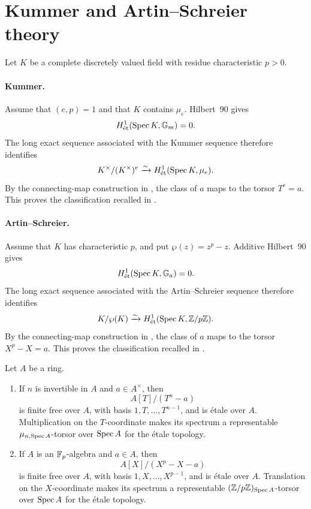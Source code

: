 \section{Kummer and Artin--Schreier theory}
\label{appendix:kummer_and_as_proofs}

Let $K$ be a complete discretely valued field with residue characteristic
$p>0$.

\paragraph{Kummer.}

Assume that $(e,p)=1$ and that $K$ contains $\mu_e$. Hilbert~90 gives
\[
H^1_{\mathrm{\acute et}}(\operatorname{Spec} K,\mathbb{G}_m)=0.
\]
The long exact sequence associated with the Kummer sequence therefore
identifies
\[
K^\times/(K^\times)^e
\xrightarrow{\sim}
H^1_{\mathrm{\acute et}}(\operatorname{Spec} K,\mu_e).
\]
By the connecting-map construction in
, the class of $a$ maps to
the torsor $T^e=a$. This proves the classification recalled in
.

\paragraph{Artin--Schreier.}

Assume that $K$ has characteristic $p$, and put $\wp(z)=z^p-z$.
Additive Hilbert~90 gives
\[
H^1_{\mathrm{\acute et}}(\operatorname{Spec} K,\mathbb{G}_a)=0.
\]
The long exact sequence associated with the Artin--Schreier sequence therefore
identifies
\[
K/\wp(K)
\xrightarrow{\sim}
H^1_{\mathrm{\acute et}}(\operatorname{Spec} K,\mathbb{Z}/p\mathbb{Z}).
\]
By the connecting-map construction in
, the class of $a$ maps to
the torsor $X^p-X=a$. This proves the classification recalled in
.

\begin{lemma}
\label{lemma:classical_cyclic_equations_etale_torsors}
Let $A$ be a ring.
\begin{enumerate}[label=(\roman*)]
    \item If $n$ is invertible in $A$ and $a\in A^\times$, then
    \[
    A[T]/(T^n-a)
    \]
    is finite free over $A$, with basis $1,T,\dots,T^{n-1}$, and is
    \'etale over $A$. Multiplication on the $T$-coordinate makes its
    spectrum a representable $\mu_{n,\operatorname{Spec} A}$-torsor over $\operatorname{Spec} A$ for
    the \'etale topology.
    \item If $A$ is an $\mathbb{F}_p$-algebra and $a\in A$, then
    \[
    A[X]/(X^p-X-a)
    \]
    is finite free over $A$, with basis $1,X,\dots,X^{p-1}$, and is
    \'etale over $A$. Translation on the $X$-coordinate makes its spectrum
    a representable $(\mathbb{Z}/p\mathbb{Z})_{\operatorname{Spec} A}$-torsor over $\operatorname{Spec} A$ for the
    \'etale topology.
\end{enumerate}
\end{lemma}


